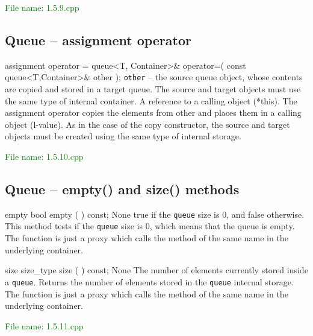 \textcolor{green}{File name: 1.5.9.cpp}


\subsection{Queue – assignment operator} %
\begin{methodinfo}
  {assignment operator =}
  {queue<T, Container>& operator=( const queue<T,Container>& other );}
  {\texttt{other} – the source queue object, whose contents are copied and stored in a target queue. 
  The source and target objects must use the same type of internal container.}
  {A reference to a calling object (*this).}
  {The assignment operator copies the elements from other and places them in a calling object (l-value). 
  As in the case of the copy constructor, the source and target objects must be created using the same 
  type of internal storage.}
\end{methodinfo}

\textcolor{green}{File name: 1.5.10.cpp}


\subsection{Queue – empty() and size() methods} %
\begin{methodinfo}
  {empty}
  {bool empty ( ) const;}
  {None}
  {true if the \texttt{queue} size is 0, and false otherwise.}
  {This method tests if the \texttt{queue} size is 0, which means that the queue is empty. The function 
  is just a proxy which calls the method of the same name in the underlying container.}
\end{methodinfo}
\begin{methodinfo}
  {size}
  {size_type size ( ) const;}
  {None}
  {The number of elements currently stored inside a \texttt{queue}.}
  {Returns the number of elements stored in the \texttt{queue} internal storage.  The function is just a 
  proxy which calls the method of the same name in the underlying container.}
\end{methodinfo}

\textcolor{green}{File name: 1.5.11.cpp}


